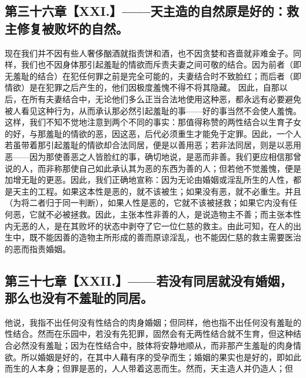
\subsection{第三十六章【XXI.】——天主造的自然原是好的：救主修复被败坏的自然。}

现在我们并不因有些人奢侈酗酒就指责饼和酒，也不因贪婪和吝啬就非难金子。同样，我们也不因身体那引起羞耻的情欲而斥责夫妻之间可敬的结合。因为前者（即无羞耻的结合）在犯任何罪之前是完全可能的，夫妻结合时不致脸红；而后者（即情欲）是在犯罪之后产生的，他们因极度羞愧不得不将其隐藏。 因此，自那以后，在所有夫妻结合中，无论他们多么正当合法地使用这种恶，都永远有必要避免被人看见这种行为，从而承认那必然引起羞耻的事——好的事当然不会使人羞愧。这样，我们不知不觉地注意到两个不同的事实：那值得称赞的两性结合以生育子女的好，与那羞耻的情欲的恶，因这恶，后代必须重生才能免于定罪。因此，一个人若虽带着那引起羞耻的情欲却合法同居，便是以善用恶；若非法同居，则是以恶用恶——因为那使善恶之人皆脸红的事，确切地说，是恶而非善。我们更应相信那曾说的人，而非称那使自己如此承认其为恶的东西为善的人；但若他不觉羞愧，便是加增无耻的更恶。因此，我们正确地宣称：因为无论由婚姻或淫乱所生的人性，都是天主的工程。如果这本性是恶的，就不该被生；如果没有恶，就不必重生。并且（为将二者归于同一判断），如果人性是恶的，它就不该被拯救；如果它内没有任何恶，它就不必被拯救。因此，主张本性非善的人，是说造物主不善；而主张本性内无恶的人，是在其败坏的状态中剥夺了它一位仁慈的救主。由此可知，在人的出生中，既不能因善的造物主所形成的善而原谅淫乱，也不能因仁慈的救主需要医治的恶而指责婚姻。\par


\subsection{第三十七章【XXII.】——若没有同居就没有婚姻，那么也没有不羞耻的同居。}

他说，我指不出任何没有性结合的肉身婚姻；但同样，他也指不出任何没有羞耻的性结合。然而在乐园中，若没有先犯罪，固然会有无两性结合就不生育，但这种结合必然没有羞耻；因为在性结合中，肢体将安静地顺从，而非那产生羞耻的肉身情欲。所以婚姻是好的，在其中人藉有序的受孕而生；婚姻的果实也是好的，即如此而生的人本身；但罪是恶的，人人带着这恶而生。然而，天主造人并仍造人；但\par

